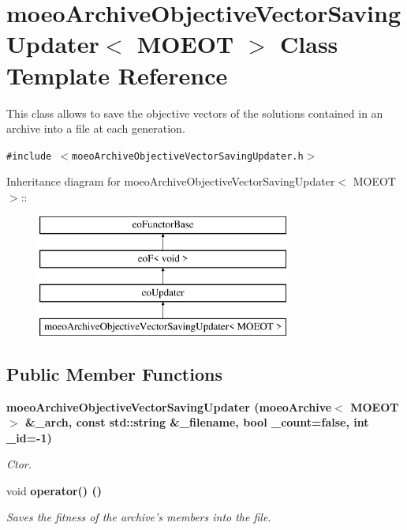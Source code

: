 \section{moeo\-Archive\-Objective\-Vector\-Saving\-Updater$<$ MOEOT $>$ Class Template Reference}
\label{classmoeoArchiveObjectiveVectorSavingUpdater}
This class allows to save the objective vectors of the solutions contained in an archive into a file at each generation.  


{\tt \#include $<$moeo\-Archive\-Objective\-Vector\-Saving\-Updater.h$>$}

Inheritance diagram for moeo\-Archive\-Objective\-Vector\-Saving\-Updater$<$ MOEOT $>$::\begin{figure}[H]
\begin{center}
\leavevmode
\includegraphics[height=4cm]{classmoeoArchiveObjectiveVectorSavingUpdater}
\end{center}
\end{figure}
\subsection*{Public Member Functions}
\begin{CompactItemize}
\item 
\bf{moeo\-Archive\-Objective\-Vector\-Saving\-Updater} (\bf{moeo\-Archive}$<$ MOEOT $>$ \&\_\-arch, const std::string \&\_\-filename, bool \_\-count=false, int \_\-id=-1)
\begin{CompactList}\small\item\em Ctor. \item\end{CompactList}\item 
void \bf{operator()} ()\label{classmoeoArchiveObjectiveVectorSavingUpdater_0f6770822c62463ee3b56f7a4c59a850}

\begin{CompactList}\small\item\em Saves the fitness of the archive's members into the file. \item\end{CompactList}\end{CompactItemize}
